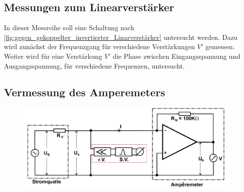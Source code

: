 \subsection{Messungen zum Linearverstärker}
In dieser Messreihe soll eine Schaltung nach \cref{fig:gegen_gekoppelter_invertierter_Linarverstärker} untersucht werden.
Dazu wird zunächst der Frequenzgang für verschiedene Verstärkungen $V'$ gemessen.
Weiter wird für eine Verstärkung $V'$ die Phase zwischen Eingangsspannung und Ausgangsspannung, für verschiedene Frequenzen, untersucht.
\subsection{Vermessung des Amperemeters}
\begin{figure}[h!]
	\centering
	\includegraphics[width=\textwidth]{../Grafiken/Messung_Amperemeter.png}
\end{figure}